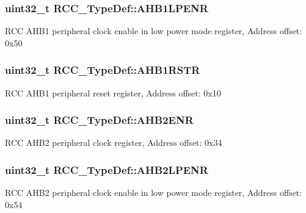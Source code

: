 \subsubsection[{\texorpdfstring{A\+H\+B1\+L\+P\+E\+NR}{AHB1LPENR}}]{ uint32\+\_\+t R\+C\+C\+\_\+\+Type\+Def\+::\+A\+H\+B1\+L\+P\+E\+NR}\hypertarget{struct_r_c_c___type_def_a89d6c21f02196b7f59bcc30c1061dd87}{}\label{struct_r_c_c___type_def_a89d6c21f02196b7f59bcc30c1061dd87}
R\+CC A\+H\+B1 peripheral clock enable in low power mode register, Address offset\+: 0x50 
\subsubsection[{\texorpdfstring{A\+H\+B1\+R\+S\+TR}{AHB1RSTR}}]{ uint32\+\_\+t R\+C\+C\+\_\+\+Type\+Def\+::\+A\+H\+B1\+R\+S\+TR}\hypertarget{struct_r_c_c___type_def_ad6abf71a348744aa3f2b7e8b214c1ca4}{}\label{struct_r_c_c___type_def_ad6abf71a348744aa3f2b7e8b214c1ca4}
R\+CC A\+H\+B1 peripheral reset register, Address offset\+: 0x10 
\subsubsection[{\texorpdfstring{A\+H\+B2\+E\+NR}{AHB2ENR}}]{ uint32\+\_\+t R\+C\+C\+\_\+\+Type\+Def\+::\+A\+H\+B2\+E\+NR}\hypertarget{struct_r_c_c___type_def_af326cb98c318fc08894a8dd79c2c675f}{}\label{struct_r_c_c___type_def_af326cb98c318fc08894a8dd79c2c675f}
R\+CC A\+H\+B2 peripheral clock register, Address offset\+: 0x34 
\subsubsection[{\texorpdfstring{A\+H\+B2\+L\+P\+E\+NR}{AHB2LPENR}}]{ uint32\+\_\+t R\+C\+C\+\_\+\+Type\+Def\+::\+A\+H\+B2\+L\+P\+E\+NR}\hypertarget{struct_r_c_c___type_def_a1de344446cba3f4dd15c56fbe20eb0dd}{}\label{struct_r_c_c___type_def_a1de344446cba3f4dd15c56fbe20eb0dd}
R\+CC A\+H\+B2 peripheral clock enable in low power mode register, Address offset\+: 0x54 
